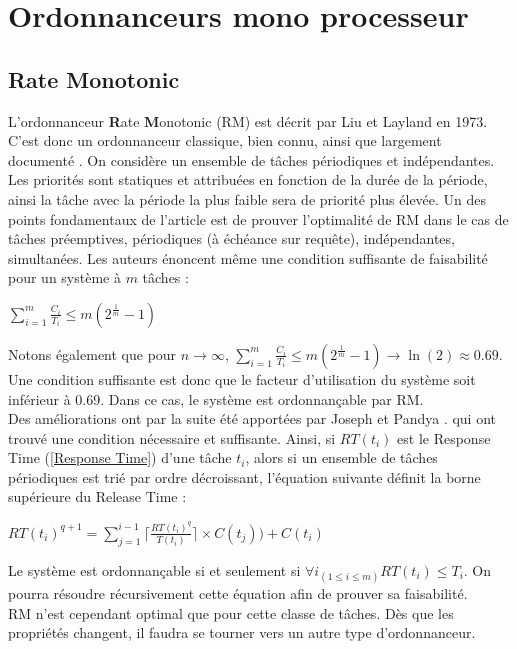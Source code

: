 \documentclass[11pt,a4paper,oneside]{report}
\begin{document}
\section{Ordonnanceurs mono processeur}

\subsection{Rate Monotonic}
L'ordonnanceur \textbf{R}ate \textbf{M}onotonic (RM) est décrit par Liu et Layland \cite{liu_scheduling_1973} en 1973. C'est 
donc un ordonnanceur classique, bien connu, ainsi que largement documenté \cite{kermia_ordonnancement_2009}. 
On considère un ensemble de tâches périodiques et indépendantes.
Les priorités sont statiques et attribuées en fonction de la durée de la période, ainsi 
la tâche avec la période la plus faible sera de priorité plus élevée. 
Un des points fondamentaux de l'article est de prouver l'optimalité de RM dans le cas de tâches 
préemptives, périodiques (à échéance sur requête), indépendantes, simultanées.
Les auteurs énoncent même une condition suffisante de faisabilité pour un système à $m$ tâches : \\
\begin{center}
	$\sum_{i=1}^{m}\frac{C_i}{T_i} \leq m(2^{\frac{1}{m}}-1)$
\end{center}
Notons également que pour $n \rightarrow \infty$, $\sum_{i=1}^{m}\frac{C_i}{T_i} \leq m(2^{\frac{1}{m}}-1) \rightarrow \ln(2) \approx 0.69$.
Une condition suffisante est donc que le facteur d'utilisation du système soit inférieur à 0.69. 
Dans ce cas, le système est ordonnançable par RM.\\

Des améliorations ont par la suite été apportées par Joseph et Pandya \cite{DBLP}.
qui ont trouvé une condition nécessaire et suffisante. 
Ainsi, si $RT(t_i)$ est le Response Time (\ref{Response Time}) d'une tâche $t_i$, 
alors si un ensemble de tâches périodiques est trié par ordre décroissant, l'équation suivante 
définit la borne supérieure du Release Time :
\begin{center}
	$RT(t_i)^{q+1} = \sum_{j=1}^{i-1} \lceil \frac{RT(t_i)^q}{T(t_i)} \rceil \times C(t_j)) + C(t_i)$
\end{center}
Le système est ordonnançable si et seulement si $\forall i_{(1 \leq i \leq m)}RT(t_i) \leq T_i$.
On pourra résoudre récursivement cette équation afin de prouver sa faisabilité.\\

RM n'est cependant optimal que pour cette classe de tâches. Dès que les propriétés changent, 
il faudra se tourner vers un autre type d'ordonnanceur.
\end{document}
